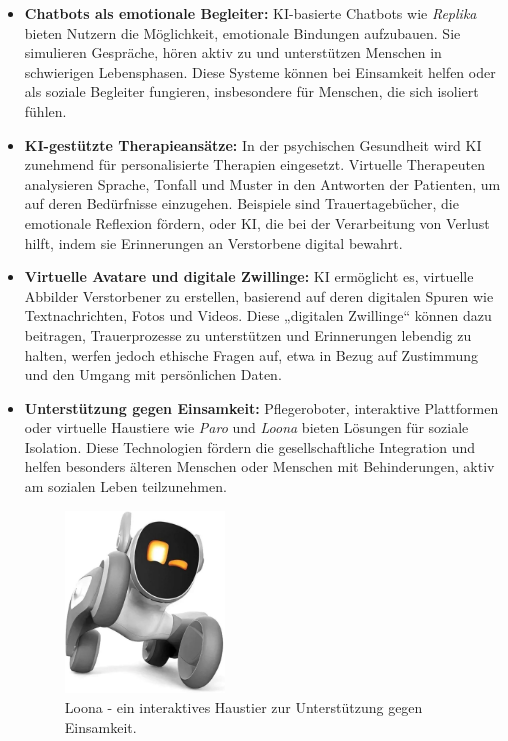 \documentclass[a4paper,12pt]{article}
\begin{document}
\begin{itemize} \item \textbf{Chatbots als emotionale Begleiter:}
KI-basierte Chatbots wie \textit{Replika} bieten Nutzern die Möglichkeit, emotionale Bindungen aufzubauen. Sie simulieren Gespräche, hören aktiv zu und unterstützen Menschen in schwierigen Lebensphasen. Diese Systeme können bei Einsamkeit helfen oder als soziale Begleiter fungieren, insbesondere für Menschen, die sich isoliert fühlen.

\item \textbf{KI-gestützte Therapieansätze:}  
In der psychischen Gesundheit wird KI zunehmend für personalisierte Therapien eingesetzt. Virtuelle Therapeuten analysieren Sprache, Tonfall und Muster in den Antworten der Patienten, um auf deren Bedürfnisse einzugehen. Beispiele sind Trauertagebücher, die emotionale Reflexion fördern, oder KI, die bei der Verarbeitung von Verlust hilft, indem sie Erinnerungen an Verstorbene digital bewahrt.

\item \textbf{Virtuelle Avatare und digitale Zwillinge:}  
KI ermöglicht es, virtuelle Abbilder Verstorbener zu erstellen, basierend auf deren digitalen Spuren wie Textnachrichten, Fotos und Videos. Diese „digitalen Zwillinge“ können dazu beitragen, Trauerprozesse zu unterstützen und Erinnerungen lebendig zu halten, werfen jedoch ethische Fragen auf, etwa in Bezug auf Zustimmung und den Umgang mit persönlichen Daten.

\item \textbf{Unterstützung gegen Einsamkeit:}  
Pflegeroboter, interaktive Plattformen oder virtuelle Haustiere wie \textit{Paro} und \textit{Loona} bieten Lösungen für soziale Isolation. Diese Technologien fördern die gesellschaftliche Integration und helfen besonders älteren Menschen oder Menschen mit Behinderungen, aktiv am sozialen Leben teilzunehmen.

\begin{figure}[h]
    \centering
    \includegraphics[width=0.4\textwidth]{image-3.png}
    \caption{Loona - ein interaktives Haustier zur Unterstützung gegen Einsamkeit.}
    \label{fig:example2}
\end{figure}


\end{itemize}
\end{document}
